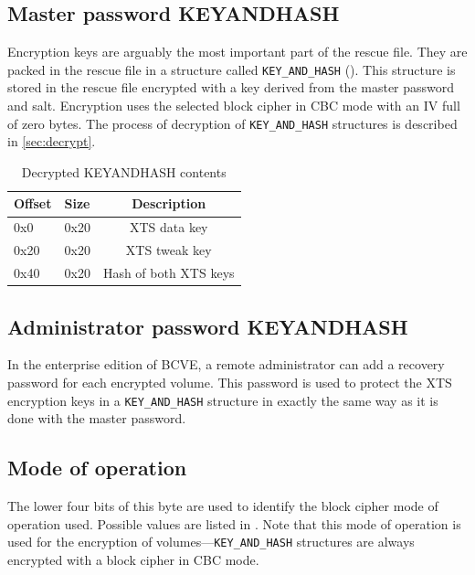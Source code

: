 \documentclass[thesis=B,english]{FITthesis}[2012/10/20]
\begin{document}
	\subsection{Master password KEY\textunderscore{}AND\textunderscore{}HASH}
	
	Encryption keys are arguably the most important part of the rescue file. They are packed in the rescue file in a structure called \verb|KEY_AND_HASH| (). This structure is stored in the rescue file encrypted with a key derived from the master password and salt. Encryption uses the selected block cipher in CBC mode with an IV full of zero bytes. The process of decryption of \verb|KEY_AND_HASH| structures is described in \cref{sec:decrypt}. 
	
	
	\begin{table}
		\centering
		\begin{tabular}{|l | l | c |} 
			\hline
			Offset & Size & Description \\
			\hline \hline
			0x0  & 0x20 & XTS data key \\
			\hline
			0x20 & 0x20 & XTS tweak key \\ 
			\hline
			0x40 & 0x20 & Hash of both XTS keys\\ 
			\hline
		\end{tabular}
		\caption{Decrypted KEY\TextUnderscore{}AND\TextUnderscore{}HASH contents}
		\label{tab:keyandhash}
	\end{table}
	
	\subsection{Administrator password KEY\textunderscore{}AND\textunderscore{}HASH}
	
	In the enterprise edition of BCVE, a remote administrator can add a recovery password for each encrypted volume. This password is used to protect the XTS encryption keys in a \verb|KEY_AND_HASH| structure in exactly the same way as it is done with the master password.
	
	\subsection{Mode of operation}
	
	The lower four bits of this byte are used to identify the block cipher mode of operation used. Possible values are listed in . Note that this mode of operation is used for the encryption of volumes---\verb|KEY_AND_HASH| structures are always encrypted with a block cipher in CBC mode.
	
\end{document}
